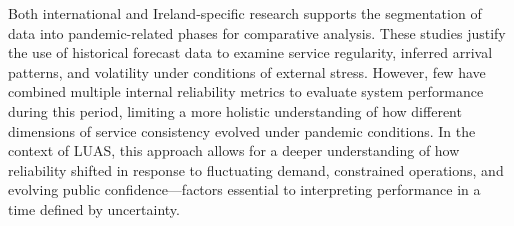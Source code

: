     Both international and Ireland-specific research supports the segmentation of data into pandemic-related phases for comparative analysis. These studies justify the use of historical forecast data to examine service regularity, inferred arrival patterns, and volatility under conditions of external stress. However, few have combined multiple internal reliability metrics to evaluate system performance during this period, limiting a more holistic understanding of how different dimensions of service consistency evolved under pandemic conditions. In the context of LUAS, this approach allows for a deeper understanding of how reliability shifted in response to fluctuating demand, constrained operations, and evolving public confidence—factors essential to interpreting performance in a time defined by uncertainty.

